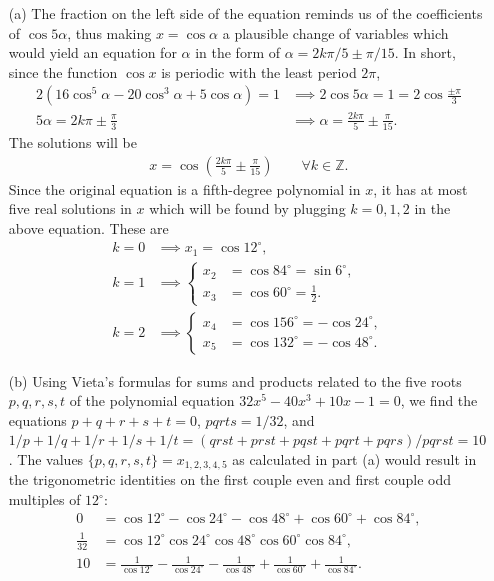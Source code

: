 \documentclass[12pt,a4paper]{memoir}
\theoremstyle{definition}
\begin{document}
\begin{solution}[name=Solution by Parviz Shahriari]
	\begin{itemize}
		\item[(a)] The fraction on the left side of the equation reminds us of the coefficients of $\cos 5\alpha$, thus making $x=\cos \alpha$ a plausible change of variables which would yield an equation for $\alpha$ in the form of $\alpha = 2k\pi/5 \pm \pi/15$. In short, since the function $\cos x$ is periodic with the least period $2\pi$,
		\begin{align*}
			2(16\cos^5 \alpha - 20\cos^3\alpha + 5\cos \alpha) = 1 &\implies 2\cos 5 \alpha = 1 = 2\cos \frac{\pm \pi}{3}\\ 5\alpha = 2k\pi \pm \frac{\pi}{3} &\implies \alpha = \frac{2k\pi}{5}\pm\frac{\pi}{15}.
		\end{align*}
		The solutions will be
		\begin{align*}
			x=\cos\left(\frac{2k\pi}{5}\pm\frac{\pi}{15}\right) \qquad \forall k \in \mathbb Z.
		\end{align*}
		Since the original equation is a fifth-degree polynomial in $x$, it has at most five real solutions in $x$ which will be found by plugging $k=0,1,2$ in the above equation. These are
		\begin{align*}
			k=0 & \implies x_1 = \cos 12^\circ,\\
			k=1 & \implies \begin{cases}
				x_2 &= \cos 84^\circ = \sin 6^\circ,\\
				x_3 &= \cos 60^\circ = \frac{1}{2}.
			\end{cases}\\
			k=2 & \implies \begin{cases}
				x_4 &= \cos 156^\circ = -\cos 24^\circ,\\
				x_5 &= \cos 132^\circ = -\cos 48^\circ.
			\end{cases}
		\end{align*}
		\item[(b)] Using Vieta's formulas for sums and products related to the five roots $p,q,r,s,t$ of the polynomial equation $32x^5 - 40x^3 + 10x-1 = 0$, we find the equations $p+q+r+s+t=0$, $pqrts=1/32$, and $1/p + 1/q + 1/r + 1/s + 1/t = (qrst+prst+pqst+pqrt+pqrs)/pqrst = 10$. The values $\{p,q,r,s,t\}=x_{1,2,3,4,5}$ as calculated in part (a) would result in the trigonometric identities on the first couple even and first couple odd multiples of $12^\circ$:
		\begin{align*}
			0 &= \cos 12^\circ - \cos 24^\circ - \cos 48^\circ + \cos 60^\circ + \cos 84^\circ,\\
			\frac{1}{32} &= \cos 12^\circ \cos 24^\circ \cos 48^\circ \cos 60^\circ \cos 84^\circ,\\
			10 &= \frac{1}{\cos 12^\circ} -\frac{1}{\cos 24^\circ}-\frac{1}{\cos 48^\circ} + \frac{1}{\cos 60^\circ} +\frac{1}{\cos 84^\circ}.
		\end{align*}
	\end{itemize}
\end{solution}
\end{document}
